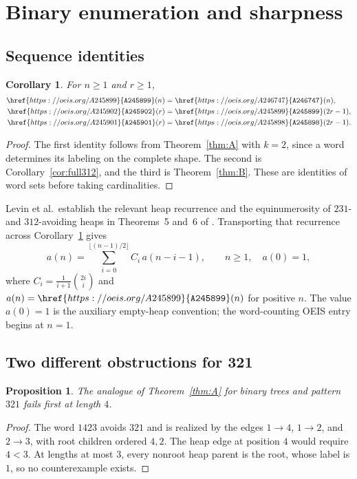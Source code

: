 \documentclass[11pt]{article}
\newtheorem{corollary}[theorem]{Corollary}
\newtheorem{proposition}[theorem]{Proposition}
\theoremstyle{definition}
\newcommand{\seq}[1]{\href{https://oeis.org/#1}{\texttt{#1}}}
\begin{document}
\section{Binary enumeration and sharpness}\label{sec:binary}

\subsection{Sequence identities}
\begin{corollary}\label{cor:oeis}
For $n\ge1$ and $r\ge1$,
\begin{align*}
\seq{A245899}(n)&=\seq{A246747}(n),\\
\seq{A245902}(r)&=\seq{A245899}(2r-1),\\
\seq{A245901}(r)&=\seq{A245898}(2r-1).
\end{align*}
\end{corollary}
\begin{proof}
The first identity follows from Theorem~\ref{thm:A} with $k=2$, since a word determines its labeling on the complete shape. The second is Corollary~\ref{cor:full312}, and the third is Theorem~\ref{thm:B}. These are identities of word sets before taking cardinalities.
\end{proof}

Levin et al.\ establish the relevant heap recurrence and the equinumerosity of $231$- and $312$-avoiding heaps in Theorems~5 and~6 of \cite{LPRS2016}. Transporting that recurrence across Corollary~\ref{cor:oeis} gives
\begin{equation}
a(n)=\sum_{i=0}^{\lfloor(n-1)/2\rfloor} C_i\,a(n-i-1),\qquad n\ge1,\quad a(0)=1,\label{eq:recurrence}
\end{equation}
where $C_i=\frac1{i+1}\binom{2i}{i}$ and $a(n)=\seq{A245899}(n)$ for positive $n$. The value $a(0)=1$ is the auxiliary empty-heap convention; the word-counting OEIS entry begins at $n=1$.

\subsection{Two different obstructions for 321}
\begin{proposition}\label{prop:heapfailure}
The analogue of Theorem~\ref{thm:A} for binary trees and pattern $321$ fails first at length $4$.
\end{proposition}
\begin{proof}
The word $1423$ avoids $321$ and is realized by the edges $1\to4$, $1\to2$, and $2\to3$, with root children ordered $4,2$. The heap edge at position $4$ would require $4<3$. At lengths at most $3$, every nonroot heap parent is the root, whose label is $1$, so no counterexample exists.
\end{proof}
\end{document}
